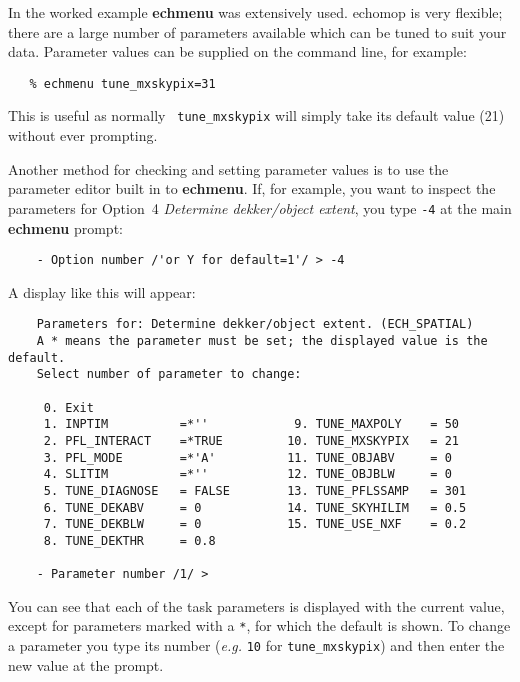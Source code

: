 \documentclass[twoside,11pt]{article}
\newcommand{\htmlref}[2]{#1}
\newcommand{\xref}[3]{#1}
\newcommand{\scspec}[2]{#1}
\newcommand{\scspec}[2]{#2}
\begin{document}
In the \htmlref{worked example}{simple_worked_example}
\xref{{\bf echmenu}}{sun152}{ECHMENU} was extensively used.
\xref{{\sc echomop}}{sun152}{} is very flexible; there are a large number of
parameters available which can be tuned to suit your data.  Parameter
values can be supplied on the command line, for example:

{
\scspec{\small}{ }
\begin{verbatim}
   % echmenu tune_mxskypix=31
\end{verbatim}
}

This is useful as normally \xref{{\tt
tune\_mxskypix}}{sun152}{par_TUNE_MXSKYPIX} will simply take its default
value (21) without ever prompting.

Another method for checking and setting parameter values is to use the
parameter editor built in to {\bf echmenu}\@.  If, for example, you want
to inspect the parameters for
\xref{Option~4 {\sl Determine dekker/object extent}}{sun152}{option4},
you type \verb+-4+ at the main {\bf echmenu} prompt:

{
\scspec{\small}{ }
\begin{verbatim}
    - Option number /'or Y for default=1'/ > -4
\end{verbatim}
}

A display like this will appear:

{
\scspec{\small}{ }
\begin{verbatim}
    Parameters for: Determine dekker/object extent. (ECH_SPATIAL)
    A * means the parameter must be set; the displayed value is the default.
    Select number of parameter to change:

     0. Exit
     1. INPTIM          =*''            9. TUNE_MAXPOLY    = 50
     2. PFL_INTERACT    =*TRUE         10. TUNE_MXSKYPIX   = 21
     3. PFL_MODE        =*'A'          11. TUNE_OBJABV     = 0
     4. SLITIM          =*''           12. TUNE_OBJBLW     = 0
     5. TUNE_DIAGNOSE   = FALSE        13. TUNE_PFLSSAMP   = 301
     6. TUNE_DEKABV     = 0            14. TUNE_SKYHILIM   = 0.5
     7. TUNE_DEKBLW     = 0            15. TUNE_USE_NXF    = 0.2
     8. TUNE_DEKTHR     = 0.8

    - Parameter number /1/ >
\end{verbatim}
}

You can see that each of the task parameters is displayed with the current
value, except for parameters marked with a \verb+*+, for which the default
is shown.  To change a parameter you type its number ({\it{e.g.}} \verb+10+
for \verb+tune_mxskypix+) and then enter the new value at the prompt.
\end{document}
